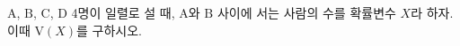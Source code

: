 $\mathrm{A}$, $\mathrm{B}$, $\mathrm{C}$, $\mathrm{D}$ 4명이 일렬로 설 때, $\mathrm{A}$와 $\mathrm{B}$ 사이에 서는 사람의 수를 확률변수 $X$라 하자. 이때 $\mathrm{V}(X)$를 구하시오.
